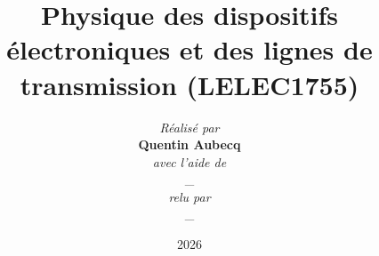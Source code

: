 \documentclass[12pt,a4paper]{article}
\title{Physique des dispositifs électroniques et des lignes de transmission (LELEC1755)}
\author{\textit{Réalisé par}\\ \textbf{Quentin Aubecq}\\\textit{avec l'aide de}\\ \_ \\\textit{relu par}\\ \_}
\date{2026}
\begin{document}
 



\renewcommand*\contentsname{Table des matières}
\tableofcontents

\break

\end{document}
